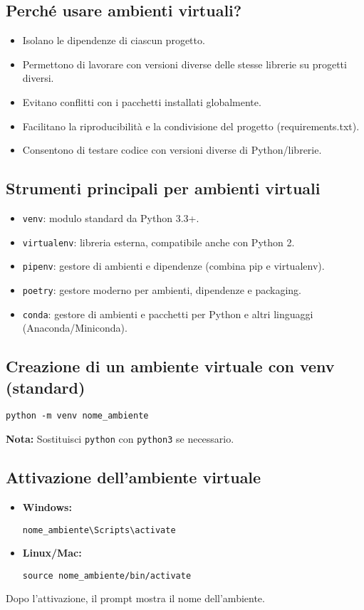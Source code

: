 \documentclass[a4paper,12pt]{article}
\begin{document}
\subsection*{Perché usare ambienti virtuali?}
\begin{itemize}
    \item Isolano le dipendenze di ciascun progetto.
    \item Permettono di lavorare con versioni diverse delle stesse librerie su progetti diversi.
    \item Evitano conflitti con i pacchetti installati globalmente.
    \item Facilitano la riproducibilità e la condivisione del progetto (requirements.txt).
    \item Consentono di testare codice con versioni diverse di Python/librerie.
\end{itemize}

\subsection*{Strumenti principali per ambienti virtuali}
\begin{itemize}
    \item \texttt{venv}: modulo standard da Python 3.3+.
    \item \texttt{virtualenv}: libreria esterna, compatibile anche con Python 2.
    \item \texttt{pipenv}: gestore di ambienti e dipendenze (combina pip e virtualenv).
    \item \texttt{poetry}: gestore moderno per ambienti, dipendenze e packaging.
    \item \texttt{conda}: gestore di ambienti e pacchetti per Python e altri linguaggi (Anaconda/Miniconda).
\end{itemize}

\subsection*{Creazione di un ambiente virtuale con venv (standard)}
\begin{lstlisting}
python -m venv nome_ambiente
\end{lstlisting}
\textbf{Nota:} Sostituisci \texttt{python} con \texttt{python3} se necessario.

\subsection*{Attivazione dell'ambiente virtuale}
\begin{itemize}
    \item \textbf{Windows:}
    \begin{lstlisting}
nome_ambiente\Scripts\activate
    \end{lstlisting}
    \item \textbf{Linux/Mac:}
    \begin{lstlisting}
source nome_ambiente/bin/activate
    \end{lstlisting}
\end{itemize}
Dopo l'attivazione, il prompt mostra il nome dell'ambiente.
\end{document}
